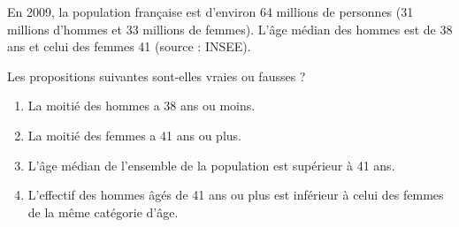 
\begin{exercice}\label{exoSeconde-0017}

En 2009, la population française est d'environ 64 millions de personnes (31 millions d'hommes et 33 millions de femmes). L'âge médian des hommes est de 38 ans et celui des femmes 41 (source : INSEE). 

Les propositions suivantes sont-elles vraies ou fausses ?
\begin{enumerate}
\item La moitié des hommes a 38 ans ou moins.
\item La moitié des femmes a 41 ans ou plus.
\item L'âge médian de l'ensemble de la population est supérieur à 41 ans.
\item L'effectif des hommes âgés de 41 ans ou plus est inférieur à celui des femmes de la même catégorie d'âge.
\end{enumerate}

\end{exercice}
